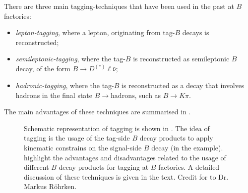 There are three main tagging-techniques that have been used in the past at $B$ factories:
\begin{itemize}
    \item \textit{lepton-tagging}, where a lepton, originating from tag-$B$ decays is reconstructed;
    \item \textit{semileptonic-tagging}, where the tag-$B$ is reconstructed as semileptonic $B$ decay, of the form $B\to D^{(*)}\ell\bar{\nu}$;
    \item \textit{hadronic-tagging}, where the tag-$B$ is reconstructed as a decay that involves hadrons in the final state $B\to\mathrm{hadrons}$, such as $B\to K\pi$.
\end{itemize}
The main advantages of these techniques are summarised in .

\begin{figure}[htbp!]
    \centering
    \subcaptionbox{\label{fig:tagging_schematic}}{
        \resizebox{0.2\textwidth}{!}{
            
            }
    }
    \caption{\label{fig:tagging_drawins} Schematic representation of tagging is shown in .
    The idea of tagging is the usage of the tag-side $B$ decay products to apply kinematic constrains on the signal-side $B$ decay (\BtoXsgamma in the example).
     highlight the advantages and disadvantages related to the usage of different $B$ decay products for tagging at $B$-factories.
    A detailed discussion of these techniques is given in the text.
    Credit for  to Dr. Markus Röhrken.}
\end{figure}

